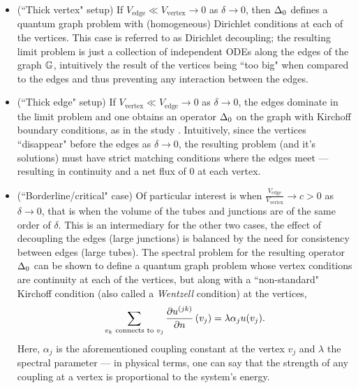 \begin{itemize}
	\item (``Thick vertex" setup) If $V_{\mathrm{edge}}\ll V_{\mathrm{vertex}}\rightarrow0$ as $\delta\rightarrow0$, then $\Delta_0$ defines a quantum graph problem with (homogeneous) Dirichlet conditions at each of the vertices.
	This case is referred to as Dirichlet decoupling; the resulting limit problem is just a collection of independent ODEs along the edges of the graph $\mathbb{G}$, intuitively the result of the vertices being ``too big" when compared to the edges and thus preventing any interaction between the edges.
	\item (``Thick edge" setup) If $V_{\mathrm{vertex}}\ll V_{\mathrm{edge}}\rightarrow0$ as $\delta\rightarrow0$, the edges dominate in the limit problem and one obtains an operator $\Delta_0$ on the graph with Kirchoff boundary conditions, as in the study \cite{kuchment2001convergence}.
	Intuitively, since the vertices ``disappear" before the edges as $\delta\rightarrow0$, the resulting problem (and it's solutions) must have strict matching conditions where the edges meet --- resulting in continuity and a net flux of 0 at each vertex.
	\item (``Borderline/critical" case) Of particular interest is when $\frac{V_{\mathrm{edge}}}{V_{\mathrm{vertex}}}\rightarrow c>0$ as $\delta\rightarrow0$, that is when the volume of the tubes and junctions are of the same order of $\delta$.
	This is an intermediary for the other two cases, the effect of decoupling the edges (large junctions) is balanced by the need for consistency between edges (large tubes).
	The spectral problem for the resulting operator $\Delta_0$ can be shown to define a quantum graph problem whose vertex conditions are continuity at each of the vertices, but along with a ``non-standard" Kirchoff condition (also called a \emph{Wentzell} condition) at the vertices,
	\begin{align*}
	\sum_{v_k \text{ connects to } v_j} 
	\dfrac{\partial u^{(jk)}}{\partial n}\left( v_j \right) = \lambda\alpha_j u(v_j).
	\end{align*}
	Here, $\alpha_j$ is the aforementioned coupling constant at the vertex $v_j$ and $\lambda$ the spectral parameter --- in physical terms, one can say that the strength of any coupling at a vertex is proportional to the system's energy.
\end{itemize}

